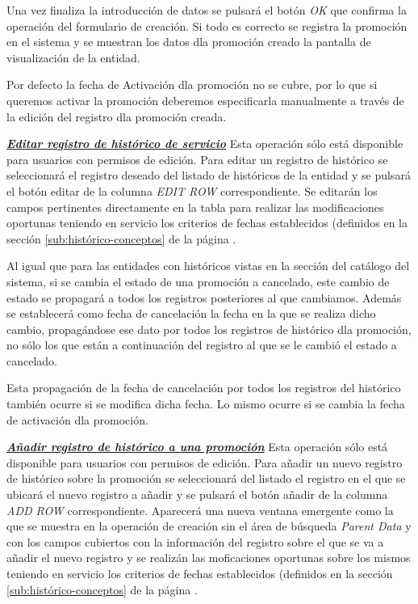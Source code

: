 Una vez finaliza la introducción de datos se pulsará el botón \emph{OK} que confirma la operación del formulario de creación. Si todo es correcto se registra la promoción en el sistema y se muestran los datos dla promoción creado la pantalla de visualización de la entidad.

Por defecto la fecha de Activación dla promoción no se cubre, por lo que si queremos activar la promoción deberemos especificarla manualmente a través de la edición del registro dla promoción creada.


\underline{\textsl{\textbf{Editar registro de histórico de servicio}}}\newline
Esta operación sólo está disponible para usuarios con permisos de edición.
Para editar un registro de histórico se seleccionará el registro deseado del listado de históricos de la entidad y se pulsará el botón editar de la columna \textit{EDIT ROW} correspondiente. Se editarán los campos pertinentes directamente en la tabla para realizar las modificaciones oportunas teniendo en servicio los criterios de fechas establecidos (definidos en la sección \ref{sub:histórico-conceptos} de la página \pageref{sub:histórico-conceptos}.

Al igual que para las entidades con históricos vistas en la sección del catálogo del sistema, si se cambia el estado de una promoción a cancelado, este cambio de estado se propagará a todos los registros posteriores al que cambiamos. Además se establecerá como fecha de cancelación la fecha en la que se realiza dicho cambio, propagándose ese dato por todos los registros de histórico dla promoción, no sólo los que están a continuación del registro al que se le cambió el estado a cancelado.

Esta propagación de la fecha de cancelación por todos los registros del histórico  también ocurre si se modifica dicha fecha. Lo mismo ocurre si se cambia la fecha de activación dla promoción.

\underline{\textsl{\textbf{Añadir registro de histórico a una promoción}}}\newline
Esta operación sólo está disponible para usuarios con permisos de edición.
Para añadir un nuevo registro de histórico sobre la promoción se seleccionará del listado el registro en el que se ubicará el nuevo registro a añadir y se pulsará el botón añadir de la columna \textit{ADD ROW} correspondiente. Aparecerá una nueva ventana emergente como la que se muestra en la operación de creación sin el área de búsqueda \emph{Parent Data} y con los campos cubiertos con la información del registro sobre el que se va a añadir el nuevo registro y se realizán las moficaciones oportunas sobre los mismos teniendo en servicio los criterios de fechas establecidos (definidos en la sección \ref{sub:histórico-conceptos} de la página \pageref{sub:histórico-conceptos}.

